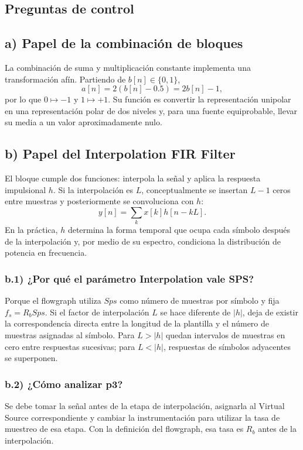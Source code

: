 \documentclass[journal]{IEEEtran}
\begin{document}
\subsection{Preguntas de control}

\subsection{a) Papel de la combinación de bloques}
La combinación de suma y multiplicación constante implementa una transformación afín. Partiendo de $b[n]\in\{0,1\}$,
\begin{equation}
a[n]=2(b[n]-0.5)=2b[n]-1,
\end{equation}
por lo que $0\mapsto-1$ y $1\mapsto+1$. Su función es convertir la representación unipolar en una representación polar de dos niveles y, para una fuente equiprobable, llevar su media a un valor aproximadamente nulo.

\subsection{b) Papel del Interpolation FIR Filter}
El bloque cumple dos funciones: interpola la señal y aplica la respuesta impulsional $h$. Si la interpolación es $L$, conceptualmente se insertan $L-1$ ceros entre muestras y posteriormente se convoluciona con $h$:
\begin{equation}
y[n]=\sum_k x[k]h[n-kL].
\end{equation}
En la práctica, $h$ determina la forma temporal que ocupa cada símbolo después de la interpolación y, por medio de su espectro, condiciona la distribución de potencia en frecuencia.

\subsubsection{b.1) ¿Por qué el parámetro Interpolation vale SPS?}
Porque el flowgraph utiliza $Sps$ como número de muestras por símbolo y fija $f_s=R_bSps$. Si el factor de interpolación $L$ se hace diferente de $|h|$, deja de existir la correspondencia directa entre la longitud de la plantilla y el número de muestras asignadas al símbolo. Para $L>|h|$ quedan intervalos de muestras en cero entre respuestas sucesivas; para $L<|h|$, respuestas de símbolos adyacentes se superponen.

\subsubsection{b.2) ¿Cómo analizar p3?}
Se debe tomar la señal antes de la etapa de interpolación, asignarla al Virtual Source correspondiente y cambiar la instrumentación para utilizar la tasa de muestreo de esa etapa. Con la definición del flowgraph, esa tasa es $R_b$ antes de la interpolación.
\end{document}
